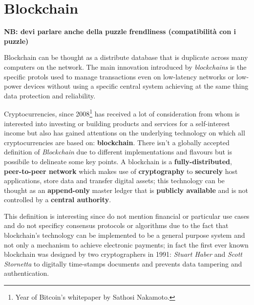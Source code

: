 \chapter{Blockchain}

\textbf{NB: devi parlare anche della puzzle frendliness (compatibilità con i puzzle)}

\newline\newline\newline\newline
Blockchain can be thought as a distribute database that is duplicate across many computers on the network.
The main innovation introduced by \textit{blockchains} is the specific protols used to manage transactions even on low-latency networks or low-power devices without using a specific central system achieving at the same thing data protection and reliability.\newline

Cryptocurrencies, since 2008\footnote{Year of Bitcoin's whitepaper by Sathosi Nakamoto.} has received a lot of consideration from whom is interested into investing or building products and services for a self-interest income but also has gained attentions on the underlying technology on which all cryptocurrencies are based on: \textbf{blockchain}.\newline
\newline
There isn't a globally accepted definition of \textit{Blockchain} due to different implementations and flavours but is possibile to delineate some key points.\newline
A blockchain is a \textbf{fully-distributed}, \textbf{peer-to-peer network} which makes use of \textbf{cryptography} to \textbf{securely} host applications, store data and transfer digital assets; this technology can be thought as an \textbf{append-only} master ledger that is \textbf{publicly available} and is not controlled by a \textbf{central authority}.

This definition is interesting since do not mention financial or particular use cases and do not specificy consensus protocols or algorithms due to the fact that blockchain's technology can be implemented to be a general purpose system and not only a mechanism to achieve electronic payments; in fact the first ever known blockchain was designed by two cryptographers in 1991: \textit{Stuart Haber} and \textit{Scott Stornetta} to digitally time-stamps documents and prevents data tampering and authentication.

